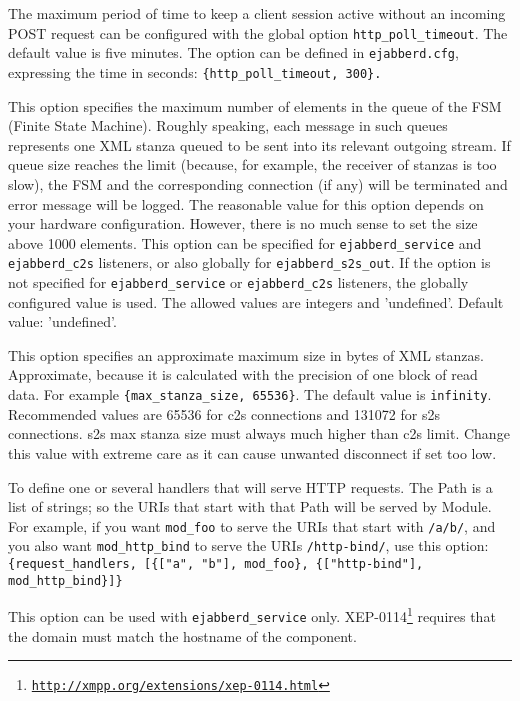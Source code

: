 \documentclass[a4paper,10pt]{book}
\newcommand{\ind}[1]{\begin{latexonly}\index{#1}\end{latexonly}}
\newcommand{\bracehack}{\def\{{\char"7B}\def\}{\char"7D}}
\newcommand{\titem}[1]{\item[\bracehack\texttt{#1}]}
\newcommand{\term}[1]{\texttt{#1}}
\gdef\footahref#1#2{#2\footnote{\href{#1}{\texttt{#1}}}}
\newcommand{\txepref}[2]{\footahref{http://xmpp.org/extensions/xep-#1.html}{#2}}
\newcommand{\xepref}[1]{\txepref{#1}{XEP-#1}}
\begin{document}
\begin{description}
    The maximum period of time to keep a client session active without
    an incoming POST request can be configured with the global option
    \term{http\_poll\_timeout}. The default value is five minutes.
    The option can be defined in \term{ejabberd.cfg}, expressing the time
    in seconds: \verb|{http_poll_timeout, 300}.|
  \titem{\{max\_fsm\_queue, Size\}}
    This option specifies the maximum number of elements in the queue of the FSM
    (Finite State Machine).
    Roughly speaking, each message in such queues represents one XML
    stanza queued to be sent into its relevant outgoing stream. If queue size
    reaches the limit (because, for example, the receiver of stanzas is too slow),
    the FSM and the corresponding connection (if any) will be terminated
    and error message will be logged.
    The reasonable value for this option depends on your hardware configuration.
    However, there is no much sense to set the size above 1000 elements.
    This option can be specified for \term{ejabberd\_service} and
    \term{ejabberd\_c2s} listeners,
    or also globally for \term{ejabberd\_s2s\_out}.
    If the option is not specified for \term{ejabberd\_service} or
    \term{ejabberd\_c2s} listeners,
    the globally configured value is used.
    The allowed values are integers and 'undefined'.
    Default value: 'undefined'.
  \titem{\{max\_stanza\_size, Size\}}
    \ind{options!max\_stanza\_size}This option specifies an
    approximate maximum size in bytes of XML stanzas.  Approximate,
    because it is calculated with the precision of one block of read
    data. For example \verb|{max_stanza_size, 65536}|.  The default
    value is \term{infinity}. Recommended values are 65536 for c2s
    connections and 131072 for s2s connections. s2s max stanza size
    must always much higher than c2s limit. Change this value with
    extreme care as it can cause unwanted disconnect if set too low.
  \titem{\{request\_handlers, [ \{Path, Module\}, ...]\}} To define one or several handlers that will serve HTTP requests.
    The Path is a list of strings; so the URIs that start with that Path will be served by Module.
    For example, if you want \term{mod\_foo} to serve the URIs that start with \term{/a/b/},
    and you also want \term{mod\_http\_bind} to serve the URIs \term{/http-bind/},
    use this option: \term{\{request\_handlers, [\{["a", "b"], mod\_foo\}, \{["http-bind"], mod\_http\_bind\}]\}}
  \titem{\{service\_check\_from, true|false\}}
    \ind{options!service\_check\_from}
    This option can be used with \term{ejabberd\_service} only.
    \xepref{0114} requires that the domain must match the hostname of the component.

\end{description}
\end{document}
